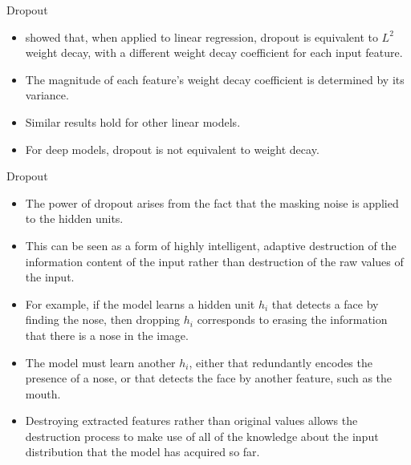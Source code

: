 \documentclass[10pt]{beamer}
\begin{document}
	\begin{frame}{Dropout}
		\begin{itemize}
			\item \citet{wager2013dropout} showed that, when applied to linear regression, dropout is equivalent to $L^2$ weight decay, with a different weight decay coefficient for each input feature.
			\pause
			\item The magnitude of each feature's weight decay coefficient is determined by its variance.
			\pause
			\item Similar results hold for other linear models.
			\pause
			\item For deep models, dropout is not equivalent to weight decay.
		\end{itemize}
	\end{frame}
	
	\begin{frame}{Dropout}
		\begin{itemize}
			\item The power of dropout arises from the fact that the masking noise is applied to the hidden units.
			\pause
			\item This can be seen as a form of highly intelligent, adaptive destruction of the information content of the input rather than destruction of the raw values of the input.
			\pause
			\item For example, if the model learns a hidden unit $h_i$ that detects a face by finding the nose, then dropping $h_i$ corresponds to erasing the information that there is a nose in the image.
			\pause
			\item The model must learn another $h_i$, either that redundantly encodes the presence of a nose, or that detects the face by another feature, such as the mouth.
			\pause
			\item Destroying extracted features rather than original values allows the destruction process to make use of all of the knowledge about the input distribution that the model has acquired so far.
		\end{itemize}
	\end{frame}
	
\end{document}
